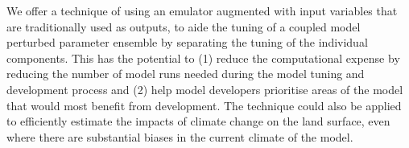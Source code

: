 \documentclass[gmd, manuscript]{copernicus}
\begin{document}
We offer a technique of using an emulator augmented with input variables that are traditionally used as outputs, to aide the tuning of a coupled model perturbed parameter ensemble by separating the tuning of the individual components. This has the potential to (1) reduce the computational expense by reducing the number of model runs needed during the model tuning and development process and (2) help model developers prioritise areas of the model that would most benefit from development. The technique could also be applied to efficiently estimate the impacts of climate change on the land surface, even where there are substantial biases in the current climate of the model.









\appendixfigures  %
\end{document}
